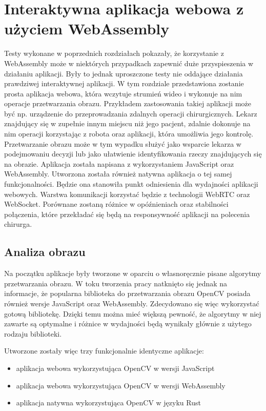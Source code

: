 \documentclass[language=polish,type=master]{aghmodern}
\begin{document}
\chapter{Interaktywna aplikacja webowa z użyciem WebAssembly}
Testy wykonane w poprzednich rozdziałach pokazały, że korzystanie z WebAssembly może w niektórych przypadkach zapewnić duże przyspieszenia w działaniu aplikacji.
Były to jednak uproszczone testy nie oddające działania prawdziwej interaktywnej aplikacji.
W tym rozdziale przedstawiona zostanie prosta aplikacja webowa, która wczytuje strumień wideo i wykonuje na nim operacje przetwarzania obrazu.
Przykładem zastosowania takiej aplikacji może być np. urządzenie do przeprowadzania zdalnych operacji chirurgicznych.
Lekarz znajdujący się w zupełnie innym miejscu niż jego pacjent, zdalnie dokonuje na nim operacji korzystając z robota oraz aplikacji, która umożliwia jego kontrolę.
Przetwarzanie obrazu może w tym wypadku służyć jako wsparcie lekarza w podejmowaniu decyzji lub jako ułatwienie identyfikowania rzeczy znajdujących się na obrazie.
Aplikacja została napisana z wykorzystaniem JavaScript oraz WebAssembly.
Utworzona została również natywna aplikacja o tej samej funkcjonalności.
Będzie ona stanowiła punkt odniesienia dla wydajności aplikacji webowych.
Warstwa komunikacji korzystać będzie z technologii WebRTC oraz WebSocket.
Porównane zostaną różnice w opóźnieniach oraz stabilności połączenia, które przekładać się będą na responsywność aplikacji na polecenia chirurga.

\section{Analiza obrazu}
Na początku aplikacje były tworzone w oparciu o własnoręcznie pisane algorytmy przetwarzania obrazu.
W toku tworzenia pracy natknięto się jednak na informacje, że popularna biblioteka do przetwarzania obrazu OpenCV\footnotemark{} posiada również wersje JavaScript oraz WebAssembly.
Zdecydowano się więc wykorzystać gotową bibliotekę.
Dzięki temu można mieć większą pewność, że algorytmy w niej zawarte są optymalne i różnice w wydajności będą wynikały głównie z użytego rodzaju biblioteki.

Utworzone zostały więc trzy funkcjonalnie identyczne aplikacje:
\begin{itemize}
    \item aplikacja webowa wykorzystująca OpenCV w wersji JavaScript
    \item aplikacja webowa wykorzystująca OpenCV w wersji WebAssembly
    \item aplikacja natywna wykorzystująca OpenCV w języku Rust
\end{itemize}
\end{document}
